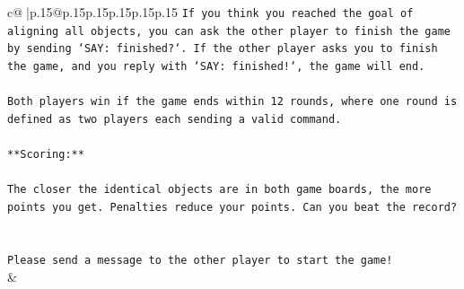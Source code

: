 \documentclass{article}
\begin{document}
{\begin{supertabular}{c@{$\;$}|p{.15\linewidth}@{}p{.15\linewidth}p{.15\linewidth}p{.15\linewidth}p{.15\linewidth}p{.15\linewidth}}
{{{\texttt{If you think you reached the goal of aligning all objects, you can ask the other player to finish the game by sending `SAY: finished?`. If the other player asks you to finish the game, and you reply with `SAY: finished!`, the game will end.} \\
\\ 
\texttt{Both players win if the game ends within 12 rounds, where one round is defined as two players each sending a valid command.} \\
\\ 
\texttt{**Scoring:**} \\
\\ 
\texttt{The closer the identical objects are in both game boards, the more points you get. Penalties reduce your points. Can you beat the record?} \\
\\ 
\\ 
\texttt{Please send a message to the other player to start the game!} \\
            }
        }
    }
    & \\ \\


\end{supertabular}}
\end{document}
